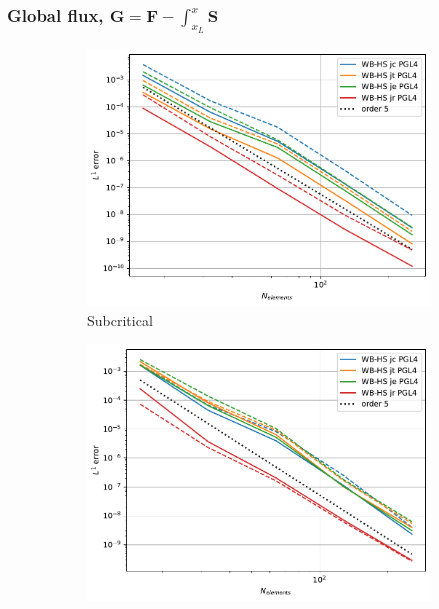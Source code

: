 \documentclass[pt12]{beamer}
\begin{document}
\begin{frame}[label=NumericalResultsWithoutWBmonodimensionalcasesSW]
\frametitle{Global flux, $\boldsymbol{G}=\boldsymbol{F}-\int^x_{x_L} \boldsymbol{S}$}

\begin{figure}
     \centering
     \begin{subfigure}[b]{0.30\textwidth}
         \centering
         \includegraphics[width=\textwidth]{alb_sub_convergenceWB-HS.pdf}
         \caption{Subcritical}
         \label{convergence_comp_jumps_sub}
     \end{subfigure}
     \begin{subfigure}[b]{0.30\textwidth}
         \centering
         \includegraphics[width=\textwidth]{alb_trans_convergenceWB-HS.pdf}

\end{subfigure}
\end{figure}
\end{frame}
\end{document}
